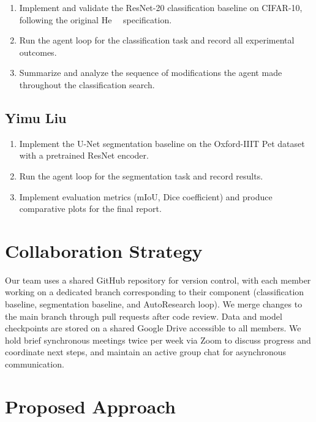 \documentclass[10pt,twocolumn,letterpaper]{article}
\begin{document}
\begin{enumerate}

\item Implement and validate the ResNet-20 classification baseline on CIFAR-10, following the original He~\etal~\cite{He2016ResNet} specification.
\item Run the agent loop for the classification task and record all experimental outcomes.
\item Summarize and analyze the sequence of modifications the agent made throughout the classification search.

\end{enumerate}

\subsection{Yimu Liu}

\begin{enumerate}

\item Implement the U-Net segmentation baseline on the Oxford-IIIT Pet dataset with a pretrained ResNet encoder.
\item Run the agent loop for the segmentation task and record results.
\item Implement evaluation metrics (mIoU, Dice coefficient) and produce comparative plots for the final report.

\end{enumerate}

\section{Collaboration Strategy}

Our team uses a shared GitHub repository for version control, with each member working on a dedicated branch corresponding to their component (classification baseline, segmentation baseline, and AutoResearch loop). We merge changes to the main branch through pull requests after code review. Data and model checkpoints are stored on a shared Google Drive accessible to all members. We hold brief synchronous meetings twice per week via Zoom to discuss progress and coordinate next steps, and maintain an active group chat for asynchronous communication.

\section{Proposed Approach}
\end{document}
